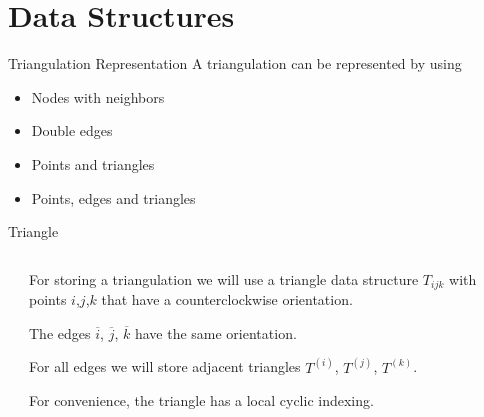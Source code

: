 \documentclass[10pt]{beamer}
\begin{document}
\section{Data Structures}

\begin{frame}{Triangulation Representation}
	A triangulation can be represented by using	
	\begin{itemize}
		\item \alert{Nodes with neighbors}
		\item \alert{Double edges}
		\item \alert{Points and triangles}
		\item \alert{Points, edges and triangles}
	\end{itemize}
\end{frame}

\begin{frame}{Triangle}
	\begin{columns}
		\begin{column}{0.5\textwidth} 
		\end{column}
		\begin{column}{0.5\textwidth} 
			For storing a triangulation we will use a triangle data structure $T_{ijk}$ with
			points $i$,$j$,$k$ that have a counterclockwise orientation.
			\bigskip

			The edges $\overline{i}$, $\overline{j}$, $\overline{k}$ 
			have the same orientation. 
			\bigskip
			
			For all edges we will store adjacent triangles $T^{(i)}$, $T^{(j)}$, $T^{(k)}$.  
			\bigskip
			
			For convenience, the triangle has a local cyclic indexing.		
			
		\end{column}
	\end{columns}
\end{frame}
\end{document}
